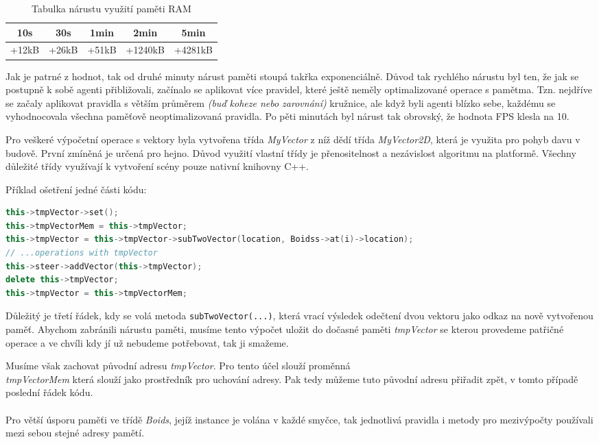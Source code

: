 \documentclass[czech,public,dept460,male,cpdeclaration]{diploma}
\begin{document}
\begin{table}[H]
	\centering
	\caption{Tabulka nárustu využití paměti RAM}
	\label{tab:ramoptimalization}
	\renewcommand{\arraystretch}{1.5}
	\begin{tabular}{| c | c | c | c | c |}
		\hline
		10s & 30s & 1min & 2min & 5min\\\hline
		+12kB & +26kB & +51kB & +1240kB & +4281kB\\
		\hline
	\end{tabular}
\end{table}

Jak je patrné z hodnot, tak od druhé minuty nárust paměti stoupá takřka exponenciálně. Důvod tak rychlého nárustu byl ten, že jak se postupně k sobě agenti přibližovali, začínalo se aplikovat více pravidel, které ještě neměly optimalizované operace s pamětma. Tzn. nejdříve se začaly aplikovat pravidla s větším průměrem \textit{(buď koheze nebo zarovnání)} kružnice, ale když byli agenti blízko sebe, každému se vyhodnocovala všechna paměťově neoptimalizovaná pravidla.
Po pěti minutách byl nárust tak obrovský, že hodnota FPS klesla na 10. 

Pro veškeré výpočetní operace s vektory byla vytvořena třída \textit{MyVector} z níž dědí třída \textit{MyVector2D}, která je využita pro pohyb davu v budově. První zmíněná je určená pro hejno. Důvod využití vlastní třídy je přenositelnost a nezávislost algoritmu na platformě. Všechny důležité třídy využívají k vytvoření scény pouze nativní knihovny C++.

Příklad ošetření jedné části kódu:

\begin{lstlisting}[language=c++,label=src:memory elimination,caption=Ukázka eliminace nárustu paměti]
this->tmpVector->set();
this->tmpVectorMem = this->tmpVector;
this->tmpVector = this->tmpVector->subTwoVector(location, Boidss->at(i)->location);
// ...operations with tmpVector
this->steer->addVector(this->tmpVector);
delete this->tmpVector;
this->tmpVector = this->tmpVectorMem;
\end{lstlisting}

Důležitý je třetí řádek, kdy se volá metoda \texttt{subTwoVector(...)}, která vrací výsledek odečtení dvou vektoru jako odkaz na nově vytvořenou paměť. Abychom zabránili nárustu paměti, musíme tento výpočet uložit do dočasné paměti \textit{tmpVector} se kterou provedeme patřičné operace a ve chvíli kdy jí už nebudeme potřebovat, tak ji smažeme.

Musíme však zachovat původní adresu \textit{tmpVector}. Pro tento účel slouží proměnná \\\textit{tmpVectorMem} která slouží jako prostředník pro uchování adresy. Pak tedy můžeme tuto původní adresu přiřadit zpět, v tomto případě poslední řádek kódu.
\\\\
Pro větší úsporu paměťi ve třídě \textit{Boids}, jejíž instance je volána v každé smyčce, tak jednotlivá pravidla i metody pro mezivýpočty používali mezi sebou stejné adresy pamětí.
\end{document}
